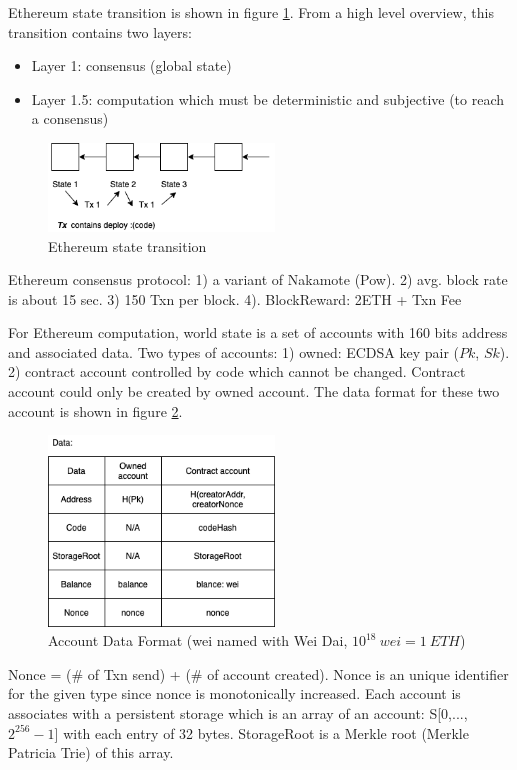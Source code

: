 \documentclass[twoside]{article}
\begin{document}
Ethereum state transition is shown in figure \ref{fig ethereum state transition}. From a high level overview, this transition contains two layers:
\begin{itemize}
\item Layer 1: consensus (global state)
\item Layer 1.5: computation which must be deterministic and subjective (to reach a consensus)
\end{itemize}

\begin{figure}[h]
\centering
\includegraphics[width=6cm]{fig_2.png}
\caption{Ethereum state transition}
\label{fig ethereum state transition}
\end{figure}

Ethereum consensus protocol: 1) a variant of Nakamote (Pow). 2) avg. block rate is about 15 sec. 3) 150 Txn per block. 4). BlockReward: 2ETH + Txn Fee

For Ethereum computation, world state is a set of accounts with 160 bits address and associated data. Two types of accounts: 1) owned: ECDSA key pair ($Pk$, $Sk$). 2) contract account controlled by code which cannot be changed. Contract account could only be created by owned account. The data format for these two account is shown in figure \ref{fig account data format}.
\begin{figure}[h]
\centering
\includegraphics[width=6cm]{fig_3.png}
\caption{Account Data Format (wei named with Wei Dai, $10^{18}~wei = 1~ETH$)}
\label{fig account data format}
\end{figure}

Nonce = (\# of Txn send) + (\# of account created). Nonce is an unique identifier for the given type since nonce is monotonically increased. Each account is associates with a persistent storage which is an array of an account: S[0,...,$2^{256} - 1$] with each entry of 32 bytes. StorageRoot is a Merkle root (Merkle Patricia Trie) of this array.
\end{document}
